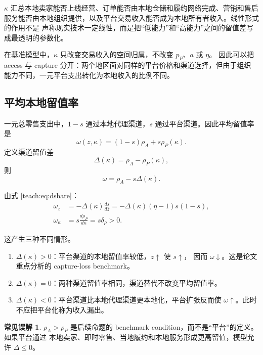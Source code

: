 \documentclass[UTF8,11pt,scheme=chinese,fontset=fandol]{ctexart}
\theoremstyle{definition}
\newtheorem{commonerror}{常见误解}[section]
\begin{document}
\(\kappa\) 汇总本地卖家能否上线经营、订单能否由本地仓储和履约网络完成、营销和售后
服务能否由本地组织提供，以及平台交易收入能否成为本地所有者收入。线性形式的作用不是
声称现实技术一定线性，而是把“低能力”和“高能力”之间的留值差写成最透明的参数化。

在基准模型中，\(\kappa\) 只改变交易收入的空间归属，不改变 \(p_P\)、\(a\) 或 \(\eta\)。
因此可以把 access 与 capture 分开：两个地区面对同样的平台价格和渠道选择，但由于组织
能力不同，一元平台支出转化为本地收入的比例不同。

\subsection{平均本地留值率}

一元总零售支出中，\(1-s\) 通过本地代理渠道，\(s\) 通过平台渠道。因此平均留值率是
\begin{equation}
\omega(z,\kappa)
=(1-s)\rho_A+s\rho_P(\kappa).
\label{teach:eq:omega}
\end{equation}
定义渠道留值差
\begin{equation}
\Delta(\kappa)=\rho_A-\rho_P(\kappa),
\end{equation}
则
\begin{equation}
\omega=\rho_A-s\Delta(\kappa).
\label{teach:eq:omega-gap}
\end{equation}

由式 \eqref{teach:eq:dshare}：
\begin{align}
\omega_z
&=-\Delta(\kappa)\frac{ds}{dz}
=-\Delta(\kappa)(\eta-1)s(1-s),
\label{teach:eq:omega-z}\\
\omega_\kappa
&=s\frac{d\rho_P}{d\kappa}
=s\delta_\rho>0.
\label{teach:eq:omega-k}
\end{align}

这产生三种不同情形。

\begin{enumerate}
  \item \(\Delta(\kappa)>0\)：平台渠道的本地留值率较低，\(z\uparrow\) 使 \(s\uparrow\)，
  因而 \(\omega\downarrow\)。这是论文重点分析的 capture-loss benchmark。
  \item \(\Delta(\kappa)=0\)：两种渠道留值率相同，渠道替代不改变平均留值率。
  \item \(\Delta(\kappa)<0\)：平台渠道比本地代理渠道更本地化，平台扩张反而使
  \(\omega\uparrow\)。此时不应把平台化称为收入漏出。
\end{enumerate}

\begin{commonerror}
\(\rho_A>\rho_P\) 是后续命题的 benchmark condition，而不是“平台”的定义。如果平台通过
本地卖家、即时零售、当地履约和本地服务形成更高留值，模型允许 \(\Delta\le0\)。
\end{commonerror}
\end{document}
